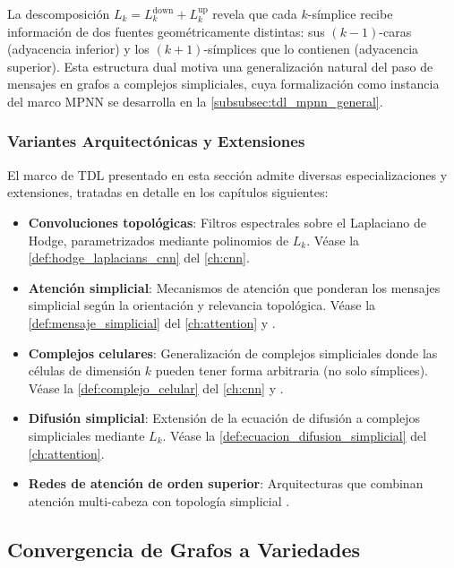 La descomposición $L_k = L_k^{\mathrm{down}} + L_k^{\mathrm{up}}$ revela que cada $k$-símplice recibe información de dos fuentes geométricamente distintas: sus $(k{-}1)$-caras (adyacencia inferior) y los $(k{+}1)$-símplices que lo contienen (adyacencia superior). Esta estructura dual motiva una generalización natural del paso de mensajes en grafos a complejos simpliciales, cuya formalización como instancia del marco \gls{MPNN} se desarrolla en la \autoref{subsubsec:tdl_mpnn_general}.

\subsubsection{Variantes Arquitectónicas y Extensiones}\label{subsubsec:variantes_tdl}

El marco de \gls{TDL} presentado en esta sección admite diversas especializaciones y extensiones, tratadas en detalle en los capítulos siguientes:

\begin{itemize}
	\item \textbf{Convoluciones topológicas}: Filtros espectrales sobre el Laplaciano de Hodge, parametrizados mediante polinomios de $L_k$. Véase la \autoref{def:hodge_laplacians_cnn} del \autoref{ch:cnn}.
	\item \textbf{Atención simplicial}: Mecanismos de atención que ponderan los mensajes simplicial según la orientación y relevancia topológica. Véase la \autoref{def:mensaje_simplicial} del \autoref{ch:attention} y \citep{giusti2022simplicial}.
	\item \textbf{Complejos celulares}: Generalización de complejos simpliciales donde las células de dimensión $k$ pueden tener forma arbitraria (no solo símplices). Véase la \autoref{def:complejo_celular} del \autoref{ch:cnn} y \citep{bodnar2021cellular}.
	\item \textbf{Difusión simplicial}: Extensión de la ecuación de difusión a complejos simpliciales mediante $L_k$. Véase la \autoref{def:ecuacion_difusion_simplicial} del \autoref{ch:attention}.
	\item \textbf{Redes de atención de orden superior}: Arquitecturas que combinan atención multi-cabeza con topología simplicial \citep{hajij2022higherorder, hajij2023topological}.
\end{itemize}

\subsection{Convergencia de Grafos a Variedades}\label{subsec:convergencia_grafos_variedades}

